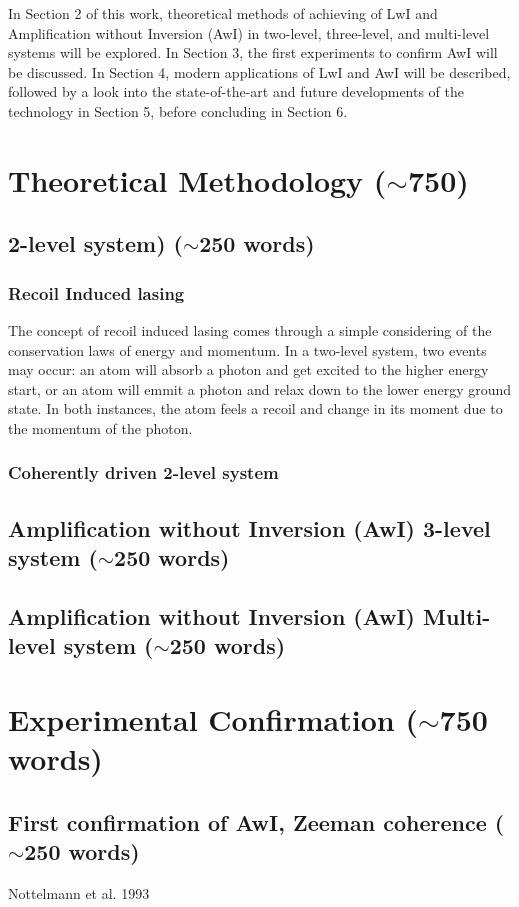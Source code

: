 \documentclass{article}
\begin{document}
In Section 2 of this work, theoretical methods of achieving of LwI and Amplification without Inversion (AwI) in two-level, three-level, and multi-level systems will be explored. In Section 3, the first experiments to confirm AwI will be discussed. In Section 4, modern applications of LwI and AwI will be described, followed by a look into the state-of-the-art and future developments of the technology in Section 5, before concluding in Section 6.

\section{Theoretical Methodology ($\sim$750)}
\subsection{2-level system) ($\sim$250 words)}
\subsubsection{Recoil Induced lasing}

The concept of recoil induced lasing comes through a simple considering of the conservation laws of energy and momentum. In a two-level system, two events may occur: an atom will absorb a photon and get excited to the higher energy start, or an atom will emmit a photon and relax down to the lower energy ground state. In both instances, the atom feels a recoil and change in its moment due to the momentum of the photon.

\subsubsection{Coherently driven 2-level system}
\subsection{Amplification without Inversion (AwI) 3-level system ($\sim$250 words)}
\subsection{Amplification without Inversion (AwI) Multi-level system ($\sim$250 words)}

\section{Experimental Confirmation ($\sim$750 words)}
\subsection{First confirmation of AwI, Zeeman coherence ($\sim$250 words)}
Nottelmann et al. 1993 \cite{Nottelmann1993}
\end{document}
